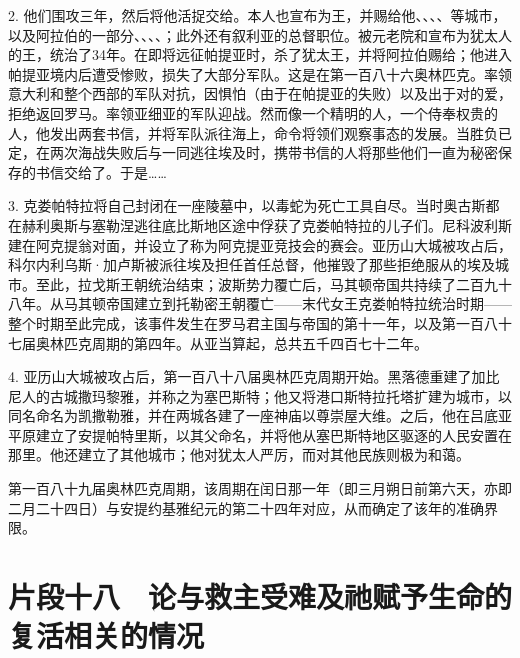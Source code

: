2. 他们围攻三年，然后将他活捉交给。本人也宣布为王，并赐给他、、、、等城市，以及阿拉伯的一部分、、、、；此外还有叙利亚的总督职位。被元老院和宣布为犹太人的王，统治了34年。在即将远征帕提亚时，杀了犹太王，并将阿拉伯赐给；他进入帕提亚境内后遭受惨败，损失了大部分军队。这是在第一百八十六奥林匹克。率领意大利和整个西部的军队对抗，因惧怕（由于在帕提亚的失败）以及出于对的爱，拒绝返回罗马。率领亚细亚的军队迎战。然而像一个精明的人，一个侍奉权贵的人，他发出两套书信，并将军队派往海上，命令将领们观察事态的发展。当胜负已定，在两次海战失败后与一同逃往埃及时，携带书信的人将那些他们一直为秘密保存的书信交给了。于是……\par

3. 克娄帕特拉将自己封闭在一座陵墓中，以毒蛇为死亡工具自尽。当时奥古斯都在赫利奥斯与塞勒涅逃往底比斯地区途中俘获了克娄帕特拉的儿子们。尼科波利斯建在阿克提翁对面，并设立了称为阿克提亚竞技会的赛会。亚历山大城被攻占后，科尔内利乌斯·加卢斯被派往埃及担任首任总督，他摧毁了那些拒绝服从的埃及城市。至此，拉戈斯王朝统治结束；波斯势力覆亡后，马其顿帝国共持续了二百九十八年。从马其顿帝国建立到托勒密王朝覆亡——末代女王克娄帕特拉统治时期——整个时期至此完成，该事件发生在罗马君主国与帝国的第十一年，以及第一百八十七届奥林匹克周期的第四年。从亚当算起，总共五千四百七十二年。\par

4. 亚历山大城被攻占后，第一百八十八届奥林匹克周期开始。黑落德重建了加比尼人的古城撒玛黎雅，并称之为塞巴斯特；他又将港口斯特拉托塔扩建为城市，以同名命名为凯撒勒雅，并在两城各建了一座神庙以尊崇屋大维。之后，他在吕底亚平原建立了安提帕特里斯，以其父命名，并将他从塞巴斯特地区驱逐的人民安置在那里。他还建立了其他城市；他对犹太人严厉，而对其他民族则极为和蔼。\par

第一百八十九届奥林匹克周期，该周期在闰日那一年（即三月朔日前第六天，亦即二月二十四日）与安提约基雅纪元的第二十四年对应，从而确定了该年的准确界限。\par


\section{片段十八　论与救主受难及祂赋予生命的复活相关的情况}

